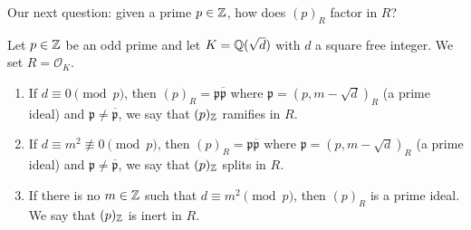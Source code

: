 
Our next question: given a prime $p \in \mathbb{Z}$, how does $(p)_R$ factor
in $R$?

\begin{theorem}
	Let $p \in \mathbb{Z}$ be an odd prime and let $K = \mathbb{Q}(\sqrt d)$
	with $d$ a square free integer.
	We set $R = \mathcal O_K$.
	\begin{enumerate}
		\item If $d \equiv 0 \pmod p$, then
		$(p)_R = \mathfrak p \overline{\mathfrak p}$ where 
		$\mathfrak p = (p, m - \sqrt d)_R$ (a prime ideal)
		and $\mathfrak p \neq \overline{\mathfrak p}$,
		we say that $(p)_{\mathbb{Z}}$ ramifies in $R$.

		\item If $d \equiv m^2 \not\equiv 0 \pmod p$,
		then $(p)_R = \mathfrak p \overline{\mathfrak p}$
		where $\mathfrak p = (p, m - \sqrt d)_R$ (a prime ideal)
		and $\mathfrak p \neq \overline{\mathfrak p}$,
		we say that $(p)_{\mathbb{Z}}$ splits in $R$.

		\item If there is no $m \in \mathbb{Z}$ such that
		$d \equiv m^2 \pmod p$, then $(p)_R$ is a prime ideal.
		We say that $(p)_{\mathbb{Z}}$ is inert in $R$.
	\end{enumerate}
\end{theorem}

